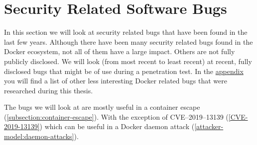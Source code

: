 \section{Security Related Software Bugs}\label{section:bugs}
In this section we will look at security related bugs that have been found in the last few years. Although there have been many security related bugs found in the Docker ecosystem, not all of them have a large impact. Others are not fully publicly disclosed. We will look (from most recent to least recent) at recent, fully disclosed bugs that might be of use during a penetration test. In the \hyperref[appendix:CVE-List]{appendix} you will find a list of other less interesting Docker related bugs that were researched during this thesis.

The bugs we will look at are mostly useful in a container escape (\autoref{subsection:container-escape}). With the exception of CVE--2019--13139 (\autoref{CVE-2019-13139}) which can be useful in a Docker daemon attack (\autoref{attacker-model:daemon-attacks}).








